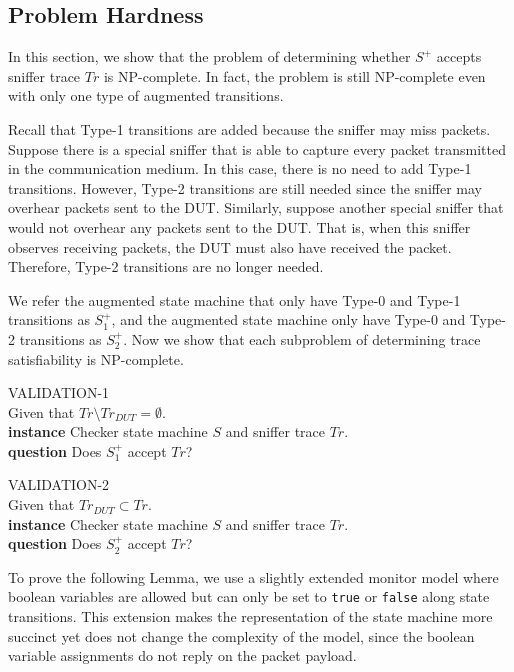 \subsection{Problem Hardness}
\label{subsec:hard}

In this section, we show that the problem of determining whether $S^+$ accepts
sniffer trace $Tr$ is NP-complete.
%
In fact, the problem is still NP-complete
even with only one type of augmented transitions.

Recall that Type-1 transitions are added because the sniffer may miss packets.
%
Suppose there is a special sniffer that is able to capture every packet
transmitted in the communication medium.
%
In this case, there is no need to add Type-1 transitions.
%
However, Type-2 transitions are still needed since the sniffer may overhear
packets sent to the DUT.
%
Similarly, suppose another special sniffer that would not overhear any packets
sent to the DUT. That is, when this sniffer observes receiving packets, the DUT
must also have received the packet.
%
Therefore, Type-2 transitions are no longer
needed.


We refer the augmented state machine that only have Type-0 and Type-1
transitions as $S^+_1$, and the augmented state machine only have Type-0 and
Type-2 transitions as $S^+_2$.
%
Now we show that each subproblem of determining trace satisfiability is
NP-complete.

\begin{problem}
  VALIDATION-1\\
  Given that $Tr\setminus Tr_{DUT}=\emptyset$.\\
  \textbf{instance} Checker state machine $S$ and sniffer trace $Tr$.\\
  \textbf{question} Does $S^+_1$ accept $Tr$?
\end{problem}

\begin{problem}
  VALIDATION-2\\
  Given that $Tr_{DUT} \subset Tr$.\\
  \textbf{instance} Checker state machine $S$ and sniffer trace $Tr$.\\
  \textbf{question} Does $S^+_2$ accept $Tr$?
\end{problem}

To prove the following Lemma, we use a slightly extended monitor model where
boolean variables are allowed but can only be set to \texttt{true} or
\texttt{false} along state transitions. This extension makes the representation
of the state machine more succinct yet does not change the complexity of the
model, since the boolean variable assignments do not reply on the packet
payload.

